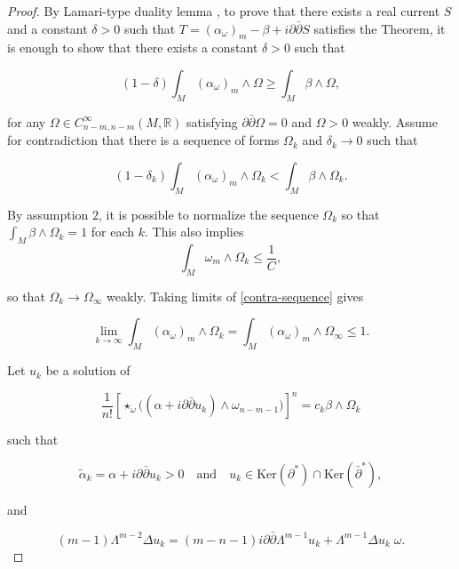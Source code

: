 \documentclass[10pt,a4paper]{amsart}
\newcommand{\pbp}{\partial \bar{\partial}}
\newcommand{\Ker}{\mbox{Ker}}
\numberwithin{equation}{section}
\begin{document}
\begin{proof}

By Lamari-type duality lemma \cite{Lamari99, DP25}, to prove that there exists a real current $S$ and a constant $\delta>0$ such that $T = (\alpha_{\omega})_{m} - \beta + i \pbp S$ satisfies the Theorem, it is enough to show that there exists a constant $\delta>0$ such that 

$$(1-\delta)\int_{M}(\alpha_{\omega})_{m}\wedge\Omega\geq\int_{M}\beta\wedge\Omega,$$

  \noindent for any $\Omega \in C^{\infty}_{n-m,n-m}(M, \mathbb R)$ satisfying $\pbp \Omega = 0$ and $\Omega>0$ weakly. Assume for contradiction that there is a sequence of forms $\Omega_k$ and $\delta_k \to 0$ such that 

  
  \begin{equation}\label{contra-sequence}
       (1-\delta_k)\int_{M}(\alpha_{\omega})_{m}\wedge\Omega_k<\int_{M}\beta\wedge\Omega_k.
  \end{equation}
 
  By assumption $2$, it is possible to normalize the sequence $\Omega_k$ so that $\int_{M}\beta\wedge\Omega_k = 1$ for each $k$. This also implies $$\int_M \omega_m \wedge \Omega_k \le \frac{1}{C},$$

  \noindent so that $\Omega_k \to \Omega_{\infty}$ weakly. Taking limits of \eqref{contra-sequence} gives
  
  $$\lim_{k \to \infty} \int_{M} (\alpha_{\omega})_{m} \wedge \Omega_{k} = \int_{M} (\alpha_{\omega})_{m} \wedge \Omega_{\infty} \leq 1.$$
  
  Let $u_k$ be a solution of 

  \begin{equation}
      \frac{1}{n!} \left[ \star_\omega \Big( (\alpha + i\partial\bar{\partial}u_k) \wedge \omega_{n-m-1} \Big) \right]^n = c_k \beta \wedge \Omega_k
  \end{equation}

  \noindent such that 

  \begin{equation}
      \tilde{\alpha}_k = \alpha + i\partial\bar{\partial}u_k > 0 \quad \text{and} \quad u_k \in \Ker(\partial^*) \cap \Ker(\bar{\partial}^*),
  \end{equation}

  \noindent and

  \begin{equation}\label{generalIC1}
      (m-1)\Lambda^{m-2} \Delta u_k = (m-n-1)i \pbp \Lambda^{m-1}  u_k +  \Lambda^{m-1} \Delta u_k \;\omega.
  \end{equation}   


\end{proof}
\end{document}
